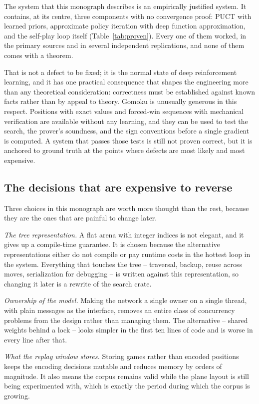 The system that this monograph describes is an empirically justified system. It
contains, at its centre, three components with no convergence proof: PUCT with
learned priors, approximate policy iteration with deep function approximation,
and the self-play loop itself (Table~\ref{tab:proven}). Every one of them worked,
in the primary sources and in several independent replications, and none of them
comes with a theorem.

That is not a defect to be fixed; it is the normal state of deep reinforcement
learning, and it has one practical consequence that shapes the engineering more
than any theoretical consideration: correctness must be established against
known facts rather than by appeal to theory. Gomoku is unusually generous in this
respect. Positions with exact values and forced-win sequences with mechanical
verification are available without any learning, and they can be used to test
the search, the prover's soundness, and the sign conventions before a single
gradient is computed. A system that passes those tests is still not proven
correct, but it is anchored to ground truth at the points where defects are most
likely and most expensive.

\subsection{The decisions that are expensive to reverse}

Three choices in this monograph are worth more thought than the rest, because
they are the ones that are painful to change later.

\emph{The tree representation.} A flat arena with integer indices is not
elegant, and it gives up a compile-time guarantee. It is chosen because the
alternative representations either do not compile or pay runtime costs in the
hottest loop in the system. Everything that touches the tree -- traversal,
backup, reuse across moves, serialization for debugging -- is written against
this representation, so changing it later is a rewrite of the search crate.

\emph{Ownership of the model.} Making the network a single owner on a single
thread, with plain messages as the interface, removes an entire class of
concurrency problems from the design rather than managing them. The alternative
-- shared weights behind a lock -- looks simpler in the first ten lines of code
and is worse in every line after that.

\emph{What the replay window stores.} Storing games rather than encoded positions
keeps the encoding decisions mutable and reduces memory by orders of magnitude.
It also means the corpus remains valid while the plane layout is still being
experimented with, which is exactly the period during which the corpus is
growing.

